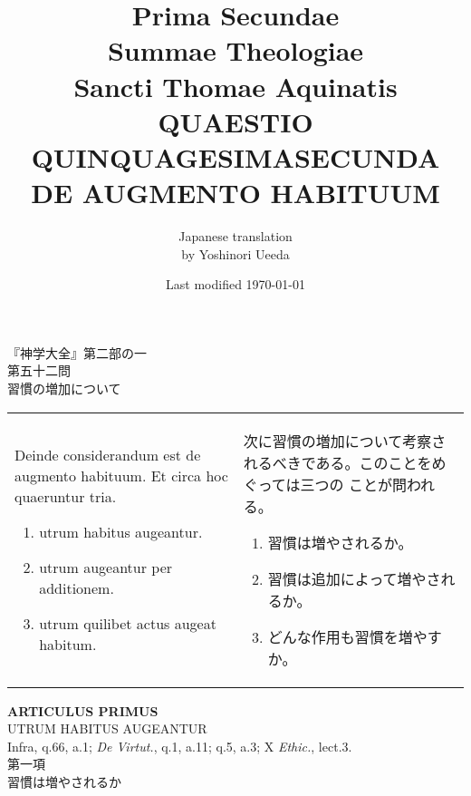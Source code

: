 \documentclass[10pt]{jsarticle} %
\title{{\bf Prima Secundae}\\{\HUGE Summae Theologiae}\\Sancti Thomae
Aquinatis\\{\sffamily QUAESTIO QUINQUAGESIMASECUNDA}\\{\bf DE AUGMENTO
HABITUUM}}
\author{Japanese translation\\by Yoshinori {\sc Ueeda}}
\date{Last modified \today}
\begin{document}
\maketitle
\thispagestyle{empty}
\begin{center}
{\Large 『神学大全』第二部の一\\第五十二問\\習慣の増加について}
\end{center}


\begin{longtable}{p{21em}p{21em}}

Deinde considerandum est de augmento habituum. Et circa hoc quaeruntur
tria. 

\begin{enumerate}
 \item utrum habitus augeantur.
 \item utrum augeantur per additionem.
 \item utrum quilibet actus augeat habitum.
\end{enumerate}

&

次に習慣の増加について考察されるべきである。このことをめぐっては三つの
 ことが問われる。
\begin{enumerate}
 \item 習慣は増やされるか。
 \item 習慣は追加によって増やされるか。
 \item どんな作用も習慣を増やすか。
\end{enumerate}
\end{longtable}



\newpage
{}
\begin{center}
{\Large {\bf ARTICULUS PRIMUS}}\\
{\large UTRUM HABITUS AUGEANTUR}\\
{\footnotesize Infra, q.66, a.1; {\itshape De Virtut.}, q.1, a.11;
 q.5, a.3; X {\itshape Ethic.}, lect.3.}\\
{\Large 第一項\\習慣は増やされるか}
\end{center}
\end{document}
